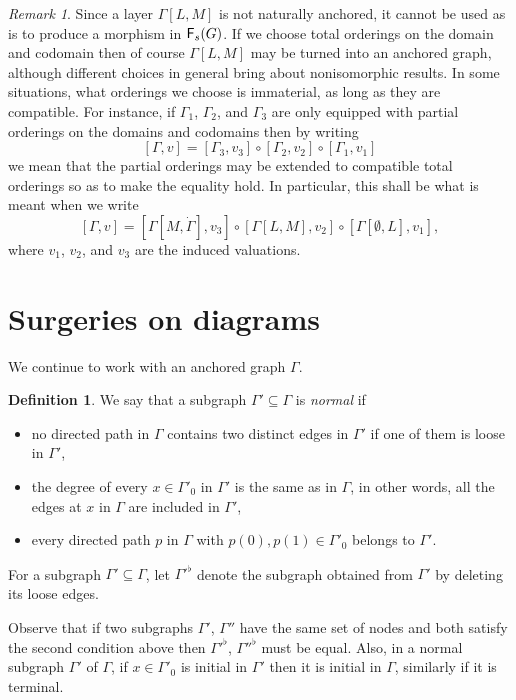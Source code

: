 \documentclass[12pt]{amsart}
\theoremstyle{plain}
\theoremstyle{definition}
\newtheorem{defn}[thm]{Definition}
\theoremstyle{remark}
\newtheorem{rem}[thm]{Remark}
\numberwithin{equation}{section}
\theoremstyle{plain}
\newcommand{\0}{\emptyset}
\newcommand{\sub}{\subseteq}
\newcommand{\cat}[1]{\textup{\textsf{#1}}}
\newcommand{\memph}[1]{{\color{magenta}\emph{#1}}}
\begin{document}
\begin{rem}\label{order:raley:com}
Since a layer $\Gamma[L, M]$ is not naturally anchored, it cannot be used as is to produce a morphism in  $\cat F_s(G)$. If we choose total orderings on the domain and codomain then of course $\Gamma[L, M]$ may be turned into an anchored graph, although different choices in general bring about nonisomorphic results. In some situations, what  orderings we choose is immaterial,  as long as they are compatible. For instance, if $\Gamma_1$, $\Gamma_2$, and $\Gamma_3$ are only equipped with partial orderings on the domains and codomains then by writing
\[
[\Gamma, v] = [\Gamma_3, v_3] \circ [\Gamma_2, v_2] \circ [\Gamma_1, v_1]
\]
we mean that the partial orderings may be extended to compatible total orderings so as to make the equality hold. In particular, this shall be what is meant when we write
\[
[\Gamma, v] = [\Gamma[M, \dot \Gamma], v_3] \circ [\Gamma[L, M], v_2] \circ [\Gamma[\0, L], v_1],
\]
where $v_1$, $v_2$, and $v_3$ are the induced valuations.
\end{rem}

\section{Surgeries on diagrams}

We continue to work with an anchored graph $\Gamma$.

\begin{defn}\label{def:full}
We say that a subgraph $\Gamma' \sub \Gamma$ is \memph{normal} if
\begin{itemize}
  \item no directed path in $\Gamma$ contains two distinct edges in $\Gamma'$ if one of them is loose in $\Gamma'$,
  \item the degree of every $x \in \Gamma'_0$ in $\Gamma'$ is the same as in $\Gamma$, in other words, all the edges at $x$ in $\Gamma$ are included in $\Gamma'$,
  \item every directed path  $p$ in $\Gamma$ with $p(0), p(1) \in \Gamma'_0$ belongs to  $\Gamma'$.
\end{itemize}
\end{defn}

For a subgraph $\Gamma' \sub \Gamma$, let $\Gamma'^{\flat}$ denote the subgraph obtained from $\Gamma'$ by deleting its loose edges.

Observe that if two subgraphs $\Gamma'$, $\Gamma''$ have the same set of nodes and both satisfy the second  condition above then $\Gamma'^{\flat}$, $\Gamma''^{\flat}$ must be equal. Also, in a normal subgraph $\Gamma'$ of $\Gamma$, if $x \in  \Gamma'_0$ is initial in $\Gamma'$ then it is initial in $\Gamma$, similarly if it is terminal.
\end{document}
